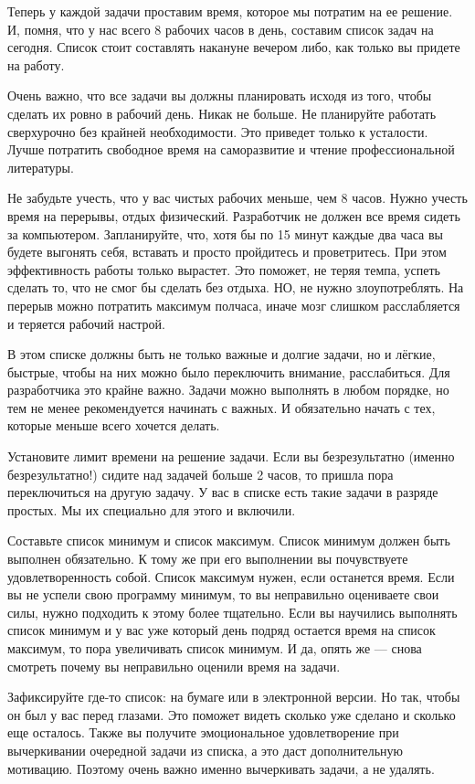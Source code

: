\documentclass{../industrial-development}
\begin{document}
\lecturenotes

Теперь у каждой задачи проставим время, которое мы потратим на ее решение. И, помня, что у нас всего 8 рабочих часов в день, составим список задач на сегодня. Список стоит составлять накануне вечером либо, как только вы придете на работу.

Очень важно, что все задачи вы должны планировать исходя из того, чтобы сделать их ровно в рабочий день. Никак не больше. Не планируйте работать сверхурочно без крайней необходимости. Это приведет только к усталости. Лучше потратить свободное время на саморазвитие и чтение профессиональной литературы.

Не забудьте учесть, что у вас чистых рабочих меньше, чем 8 часов. Нужно учесть время на перерывы, отдых физический. Разработчик не должен все время сидеть за компьютером. Запланируйте, что, хотя бы по 15 минут каждые два часа вы будете выгонять себя, вставать и просто пройдитесь и проветритесь. При этом эффективность работы только вырастет. Это поможет, не теряя темпа, успеть сделать то, что не смог бы сделать без отдыха.
НО, не нужно злоупотреблять. На перерыв можно потратить максимум полчаса, иначе мозг слишком расслабляется и теряется рабочий настрой.

В этом списке должны быть не только важные и долгие задачи, но и лёгкие, быстрые, чтобы на них можно было переключить внимание, расслабиться. Для разработчика это крайне важно. Задачи можно выполнять в любом порядке, но тем не менее рекомендуется начинать с важных. И обязательно начать с тех, которые меньше всего хочется делать.

Установите лимит времени на решение задачи. Если вы безрезультатно (именно безрезультатно!) сидите над задачей больше 2 часов, то пришла пора переключиться на другую задачу. У вас в списке есть такие задачи в разряде простых. Мы их специально для этого и включили.

Составьте список минимум и список максимум. Список минимум должен быть выполнен обязательно. К тому же при его выполнении вы почувствуете удовлетворенность собой. Список максимум нужен, если останется время. Если вы не успели свою программу минимум, то вы неправильно оцениваете свои силы, нужно подходить к этому более тщательно.
Если вы научились выполнять список минимум и у вас уже который день подряд остается время на список максимум, то пора увеличивать список минимум. И да, опять же — снова смотреть почему вы неправильно оценили время на задачи.

Зафиксируйте где-то список: на бумаге или в электронной версии. Но так, чтобы он был у вас перед глазами. Это поможет видеть сколько уже сделано и сколько еще осталось. Также вы получите эмоциональное удовлетворение при вычеркивании очередной задачи из списка, а это даст дополнительную мотивацию. Поэтому очень важно именно вычеркивать задачи, а не удалять.
\end{document}
